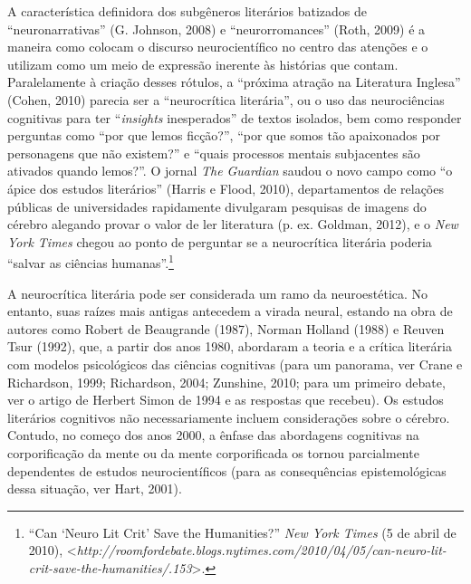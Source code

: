 A característica definidora dos subgêneros literários batizados de
``neuronarrativas'' (G. Johnson, 2008) e ``neurorromances'' (Roth, 2009)
é a maneira como colocam o discurso neurocientífico no centro das
atenções e o utilizam como um meio de expressão inerente às histórias
que contam. Paralelamente à criação desses rótulos, a ``próxima atração
na Literatura Inglesa'' (Cohen, 2010) parecia ser a ``neurocrítica
literária'', ou o uso das neurociências cognitivas para ter
``\emph{insights} inesperados'' de textos isolados, bem como responder
perguntas como ``por que lemos ficção?'', ``por que somos tão
apaixonados por personagens que não existem?'' e ``quais processos
mentais subjacentes são ativados quando lemos?''. O jornal \emph{The}
\emph{Guardian} saudou o novo campo como ``o ápice dos estudos
literários'' (Harris e Flood, 2010), departamentos de relações públicas
de universidades rapidamente divulgaram pesquisas de imagens do cérebro
alegando provar o valor de ler literatura (p. ex. Goldman, 2012), e o
\emph{New York Times} chegou ao ponto de perguntar se a neurocrítica
literária poderia ``salvar as ciências humanas''.\footnote[2]{``Can `Neuro Lit Crit' Save the Humanities?'' \emph{New York Times}
(5 de abril de 2010),
\textless{}\emph{http://roomfordebate.blogs.nytimes.com/2010/04/05/can-neuro-lit-crit-save-the-humanities/.153}\textgreater{}.}

A neurocrítica literária pode ser considerada um ramo da neuroestética.
No entanto, suas raízes mais antigas antecedem a virada neural, estando
na obra de autores como Robert de Beaugrande (1987), Norman Holland
(1988) e Reuven Tsur (1992), que, a partir dos anos 1980, abordaram a
teoria e a crítica literária com modelos psicológicos das ciências
cognitivas (para um panorama, ver Crane e Richardson, 1999; Richardson,
2004; Zunshine, 2010; para um primeiro debate, ver o artigo de Herbert
Simon de 1994 e as respostas que recebeu). Os estudos literários
cognitivos não necessariamente incluem considerações sobre o cérebro.
Contudo, no começo dos anos 2000, a ênfase das abordagens cognitivas na
corporificação da mente ou da mente corporificada os tornou parcialmente
dependentes de estudos neurocientíficos (para as consequências
epistemológicas dessa situação, ver Hart, 2001).

